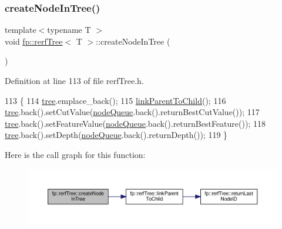 \subsubsection{\texorpdfstring{create\+Node\+In\+Tree()}{createNodeInTree()}}
{\footnotesize\ttfamily template$<$typename T $>$ \\
void \hyperlink{classfp_1_1rerfTree}{fp\+::rerf\+Tree}$<$ T $>$\+::create\+Node\+In\+Tree (\begin{DoxyParamCaption}{ }\end{DoxyParamCaption})\hspace{0.3cm}{\ttfamily [inline]}}



Definition at line 113 of file rerf\+Tree.\+h.


\begin{DoxyCode}
113                                               \{
114                     \hyperlink{classfp_1_1rerfTree_afc9392154cb4d1dde02e26a9ec31e356}{tree}.emplace\_back();
115                     \hyperlink{classfp_1_1rerfTree_a7750b048cb8beaada5279f3a702f6cc2}{linkParentToChild}();
116                     \hyperlink{classfp_1_1rerfTree_afc9392154cb4d1dde02e26a9ec31e356}{tree}.back().setCutValue(\hyperlink{classfp_1_1rerfTree_a59b3bdcba86acbe93fd46658132218a8}{nodeQueue}.back().returnBestCutValue());
117                     \hyperlink{classfp_1_1rerfTree_afc9392154cb4d1dde02e26a9ec31e356}{tree}.back().setFeatureValue(\hyperlink{classfp_1_1rerfTree_a59b3bdcba86acbe93fd46658132218a8}{nodeQueue}.back().returnBestFeature());
118                     \hyperlink{classfp_1_1rerfTree_afc9392154cb4d1dde02e26a9ec31e356}{tree}.back().setDepth(\hyperlink{classfp_1_1rerfTree_a59b3bdcba86acbe93fd46658132218a8}{nodeQueue}.back().returnDepth());
119                 \}
\end{DoxyCode}
Here is the call graph for this function\+:
\nopagebreak
\begin{figure}[H]
\begin{center}
\leavevmode
\includegraphics[width=350pt]{classfp_1_1rerfTree_a44f22d50d958ac20c12cf6714811e67c_cgraph}
\end{center}
\end{figure}
\mbox{\label{classfp_1_1rerfTree_acd1bd04959e0537502a6abbd31bda7da}} 
